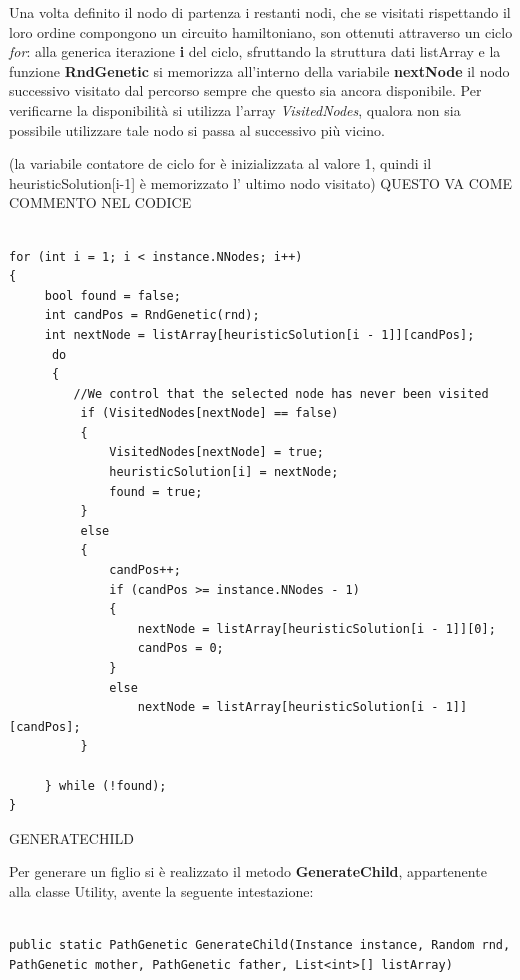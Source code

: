\documentclass[11pt]{article}
\begin{document}
Una volta definito il nodo di partenza i restanti nodi, che se visitati rispettando il loro ordine compongono un circuito hamiltoniano, son ottenuti attraverso un ciclo \textit{for}: alla generica iterazione \textbf{i} del ciclo, sfruttando la struttura dati listArray e la funzione \textbf{RndGenetic} si memorizza all'interno della variabile \textbf{nextNode} il nodo successivo visitato dal percorso sempre che questo sia ancora disponibile. Per verificarne la disponibilità si utilizza l'array \textit{VisitedNodes}, qualora non sia possibile utilizzare tale nodo si passa al successivo più vicino.


(la variabile contatore de ciclo for è inizializzata al valore 1, quindi il heuristicSolution[i-1] è memorizzato l' ultimo nodo visitato)  QUESTO VA COME COMMENTO NEL CODICE

\begin{lstlisting}

for (int i = 1; i < instance.NNodes; i++)
{
     bool found = false;
     int candPos = RndGenetic(rnd);
     int nextNode = listArray[heuristicSolution[i - 1]][candPos];
      do
      {
         //We control that the selected node has never been visited
          if (VisitedNodes[nextNode] == false)
          {
              VisitedNodes[nextNode] = true;
              heuristicSolution[i] = nextNode;
              found = true;
          }
          else
          {
              candPos++;
              if (candPos >= instance.NNodes - 1)
              {
                  nextNode = listArray[heuristicSolution[i - 1]][0];
                  candPos = 0;
              }
              else
                  nextNode = listArray[heuristicSolution[i - 1]][candPos];
          }

     } while (!found);
}

\end{lstlisting}


\vspace{2\baselineskip}
GENERATECHILD
\vspace{2\baselineskip}

Per generare un figlio si è realizzato il metodo \textbf{GenerateChild}, appartenente alla classe Utility, avente la seguente intestazione:

\begin{lstlisting}

public static PathGenetic GenerateChild(Instance instance, Random rnd, PathGenetic mother, PathGenetic father, List<int>[] listArray)

\end{lstlisting}
\end{document}
